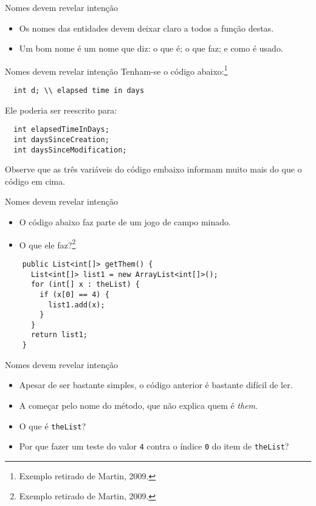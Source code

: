 \documentclass[11pt]{beamer}
\begin{document}
  \begin{frame}{Nomes devem revelar intenção}
    \begin{itemize}
      \item Os nomes das entidades devem deixar claro a todos a função destas.
      \item Um bom nome é um nome que diz: o que é; o que faz; e como é usado.
    \end{itemize}
  \end{frame}

\begin{frame}[fragile]{Nomes devem revelar intenção}
  Tenham-se o código abaixo:\footnote{Exemplo retirado de Martin, 2009.}
  
  \begin{lstlisting}
  int d; \\ elapsed time in days
  \end{lstlisting}

  Ele poderia ser reescrito para:
  
  \begin{lstlisting}
  int elapsedTimeInDays;
  int daysSinceCreation;
  int daysSinceModification;
  \end{lstlisting}
  
  Observe que as três variáveis do código embaixo informam muito mais do que o código em cima.
\end{frame}

  \begin{frame}[fragile]{Nomes devem revelar intenção}
    \begin{itemize}
      \item O código abaixo faz parte de um jogo de campo minado.
      \item O que ele faz?\footnote{Exemplo retirado de Martin, 2009.} 
    \end{itemize}
    
    \begin{lstlisting}
    public List<int[]> getThem() {
      List<int[]> list1 = new ArrayList<int[]>();
      for (int[] x : theList) {
        if (x[0] == 4) {
          list1.add(x);
        }
      }
      return list1;
    }
    \end{lstlisting}
  \end{frame}

  \begin{frame}[fragile]{Nomes devem revelar intenção}
    \begin{itemize}
      \item Apesar de ser bastante simples, o código anterior é bastante difícil de ler.
      \item A começar pelo nome do método, que não explica quem é \textit{them}.
      \item O que é \verb|theList|?
      \item Por que fazer um teste do valor \verb|4| contra o índice \verb|0| do item de \verb|theList|?
    \end{itemize}
  \end{frame}
\end{document}
